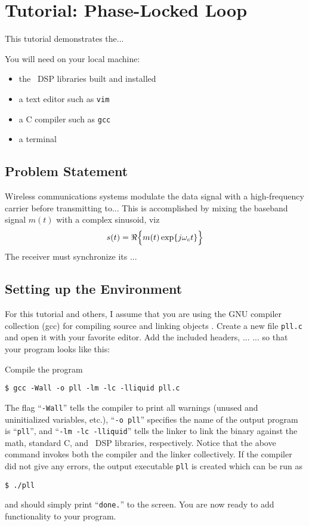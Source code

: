 % 
%

\newpage
\section{Tutorial: Phase-Locked Loop}
\label{tutorial:pll}
This tutorial demonstrates the...

You will need on your local machine:
\begin{itemize}
\item the \liquid\ DSP libraries built and installed
\item a text editor such as {\tt vim} \cite{vim:web}
\item a C compiler such as {\tt gcc} \cite{gcc:web}
\item a terminal
\end{itemize}

\subsection{Problem Statement}
\label{tutorial:pll:problem}
Wireless communications systems modulate the data signal with
a high-frequency carrier before transmitting to...
This is accomplished by mixing the baseband signal $m(t)$
with a complex sinusoid, viz
\[
    s(t) = \Re\Bigl\{ m(t)\exp\{j\omega_ct\} \Bigr\}
\]
The receiver must synchronize its ...


\subsection{Setting up the Environment}
\label{tutorial:pll:environment}

For this tutorial and others, I assume that you are using the GNU
compiler collection (gcc) for compiling source and linking objects
\cite{gcc:web}.
Create a new file {\tt pll.c} and open it with your favorite editor.
Add the included headers, ...
... so that your program looks like this:
%

%
Compile the program
%
\begin{Verbatim}[fontsize=\small]
    $ gcc -Wall -o pll -lm -lc -lliquid pll.c
\end{Verbatim}
%
The flag ``{\tt -Wall}'' tells the compiler to print all warnings
(unused and uninitialized variables, etc.),
``{\tt -o pll}'' specifies the name of the output program is
``{\tt pll}'', and
``{\tt -lm -lc -lliquid}'' tells the linker to link the binary against
the math, standard C, and \liquid\ DSP libraries, respectively.
Notice that the above command invokes both the compiler and the linker
collectively.
%
If the compiler did not give any errors, the output executable {\tt pll}
is created which can be run as
\begin{Verbatim}[fontsize=\small]
    $ ./pll
\end{Verbatim}
%
and should simply print ``{\tt done.}'' to the screen.
You are now ready to add functionality to your program.


